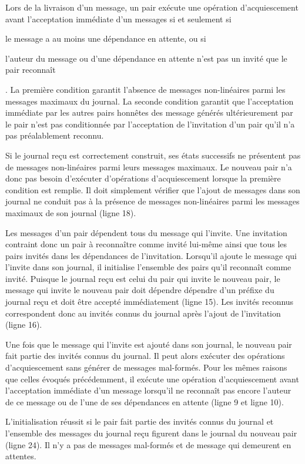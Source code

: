 Lors de la livraison d'un message, un pair exécute une opération d'acquiescement avant l'acceptation immédiate d'un messages si et seulement si \begin{inlinelist}
\item le message a au moins une dépendance en attente, ou si
\item l'auteur du message ou d'une dépendance en attente n'est pas un invité que le pair reconnaît
\end{inlinelist}.
La première condition garantit l'absence de messages non-linéaires parmi les messages maximaux du journal.
La seconde condition garantit que l'acceptation immédiate par les autres pairs honnêtes des message générés ultérieurement par le pair n'est pas conditionnée par l'acceptation de l'invitation d'un pair qu'il n'a pas préalablement reconnu.

Si le journal reçu est correctement construit, ses états successifs ne présentent pas de messages non-linéaires parmi leurs messages maximaux.
Le nouveau pair n'a donc pas besoin d'exécuter d'opérations d'acquiescement lorsque la première condition est remplie.
Il doit simplement vérifier que l'ajout de messages dans son journal ne conduit pas à la présence de messages non-linéaires parmi les messages maximaux de son journal (ligne 18).

Les messages d'un pair dépendent tous du message qui l'invite.
Une invitation contraint donc un pair à reconnaître comme invité lui-même ainsi que tous les pairs invités dans les dépendances de l'invitation.
Lorsqu'il ajoute le message qui l'invite dans son journal, il initialise l'ensemble des pairs qu'il reconnaît comme invité.
Puisque le journal reçu est celui du pair qui invite le nouveau pair, le message qui invite le nouveau pair doit dépendre dépendre d'un préfixe du journal reçu et doit être accepté immédiatement (ligne 15).
Les invités reconnus correspondent donc au invités connus du journal après l'ajout de l'invitation (ligne 16).

Une fois que le message qui l'invite est ajouté dans son journal, le nouveau pair fait partie des invités connus du journal.
Il peut alors exécuter des opérations d'acquiescement sans générer de messages mal-formés.
Pour les mêmes raisons que celles évoqués précédemment, il exécute une opération d'acquiescement avant l'acceptation immédiate d'un message lorsqu'il ne reconnaît pas encore l'auteur de ce message ou de l'une de ses dépendances en attente (ligne 9 et ligne 10).

L'initialisation réussit si le pair fait partie des invités connus du journal et l'ensemble des messages du journal reçu figurent dans le journal du nouveau pair (ligne 24).
Il n'y a pas de messages mal-formés et de message qui demeurent en attentes.



